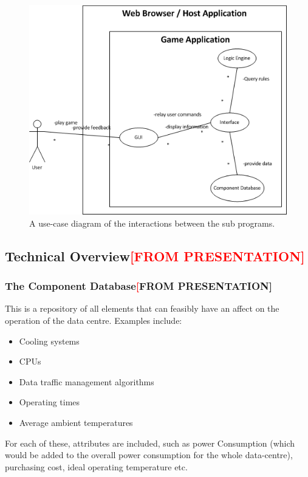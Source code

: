 \begin{figure}[H]
\centering
\includegraphics[width=5in]{Resources//Use Case Diagram.png}
\caption{A use-case diagram of the interactions between the sub programs.}
\label{fig:UseCaseDiagram}
\end{figure}

\subsection{Technical Overview\textcolor{red}{[FROM PRESENTATION]}}
\label{sec:Methodology:TechnicalOverview}
\subsubsection{The Component Database\textcolor{red}[FROM PRESENTATION]}
\label{sec:Methodology:TechnicalOverview:TheComponentDatabase}
This is a repository of all elements that can feasibly have an affect 
on the operation of the data centre. Examples include:

\begin{itemize}
\item Cooling systems
\item CPUs
\item Data traffic management algorithms
\item Operating times
\item Average ambient temperatures
\end{itemize}

For each of these, attributes are included, such as power
Consumption (which would be added to the overall power
consumption for the whole data-centre), purchasing cost, ideal operating 
temperature etc.


